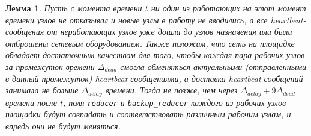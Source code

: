 \documentclass{article}
\theoremstyle{plain}
\theoremstyle{plain}
\theoremstyle{plain}
\newtheorem{lemma}{Лемма}[section]
\theoremstyle{plain}
\theoremstyle{definition}
\theoremstyle{remark}
\theoremstyle{plain}
\begin{document}
\begin{lemma}
\label{ElectionLiveness}
    Пусть с момента времени $t$ ни один из работающих на этот момент времени узлов не отказывал и новые узлы в работу не вводились, а все heartbeat-сообщения от неработающих узлов уже дошли до узлов назначения или были отброшены сетевым оборудованием. Также положим, что сеть на площадке обладает достаточным качеством для того, чтобы каждая пара рабочих узлов за промежуток времени $\Delta_{dead}$ смогла обменяться актуальными (отправленными в данный промежуток) heartbeat-сообщениями, а доставка heartbeat-сообщений занимала не больше $\Delta_{delay}$ времени. Тогда не позже, чем через $\Delta_{delay} + 9\Delta_{dead}$ времени после $t$, поля \texttt{reducer} и \texttt{backup\_reducer} каждого из рабочих узлов площадки будут совпадать и соответствовать различным рабочим узлам, и впредь они не будут меняться.
\end{lemma}
\end{document}
